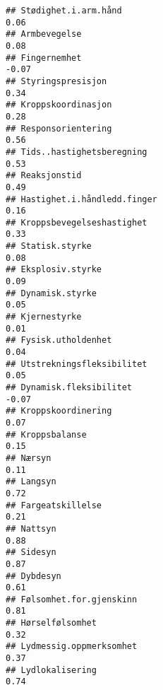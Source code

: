\documentclass[
]{article}
\begin{document}
\begin{verbatim}
## Stødighet.i.arm.hånd                                                              0.06
## Armbevegelse                                                                      0.08
## Fingernemhet                                                                     -0.07
## Styringspresisjon                                                                 0.34
## Kroppskoordinasjon                                                                0.28
## Responsorientering                                                                0.56
## Tids..hastighetsberegning                                                         0.53
## Reaksjonstid                                                                      0.49
## Hastighet.i.håndledd.finger                                                       0.16
## Kroppsbevegelseshastighet                                                         0.33
## Statisk.styrke                                                                    0.08
## Eksplosiv.styrke                                                                  0.09
## Dynamisk.styrke                                                                   0.05
## Kjernestyrke                                                                      0.01
## Fysisk.utholdenhet                                                                0.04
## Utstrekningsfleksibilitet                                                         0.05
## Dynamisk.fleksibilitet                                                           -0.07
## Kroppskoordinering                                                                0.07
## Kroppsbalanse                                                                     0.15
## Nærsyn                                                                            0.11
## Langsyn                                                                           0.72
## Fargeatskillelse                                                                  0.21
## Nattsyn                                                                           0.88
## Sidesyn                                                                           0.87
## Dybdesyn                                                                          0.61
## Følsomhet.for.gjenskinn                                                           0.81
## Hørselfølsomhet                                                                   0.32
## Lydmessig.oppmerksomhet                                                           0.37
## Lydlokalisering                                                                   0.74

\end{verbatim}
\end{document}
